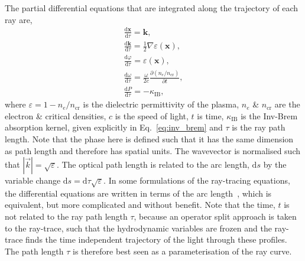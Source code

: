 The partial differential equations that are integrated along the trajectory of each ray are,
\begin{equation}
    \label{eq:SOLAS_rays}
    \begin{gathered}
        \frac{\text{d} \mathbf{x}}{\text{d} \tau}=\mathbf{k}, \\
        \frac{\text{d} \mathbf{k}}{\text{d} \tau}=\frac{1}{2} \nabla \varepsilon(\mathbf{x}), \\
        \frac{\text{d} \varphi}{\text{d} \tau}= \varepsilon(\mathbf{x}), \\
        \frac{\text{d} \omega}{\text{d} \tau}=\frac{\omega}{2 c} \frac{\partial\left(n_e / n_{\text{cr}}\right)}{\partial t}, \\
        \frac{\text{d} P}{\text{d} \tau}=-\kappa_{\text{IB}},
    \end{gathered}
\end{equation}
where $\varepsilon=1-n_e/n_{\text{cr}}$ is the dielectric permittivity of the plasma, $n_e$ \& $n_{\text{cr}}$ are the electron \& critical densities, $c$ is the speed of light, $t$ is time, $\kappa_{\text{IB}}$ is the \ac{Inv-Brem} absorption kernel, given explicitly in Eq.~\ref{eq:inv_brem} and $\tau$ is the ray path length.
Note that the phase here is defined such that it has the same dimension as path length and therefore has spatial units.
The wavevector is normalised such that $|\vec{k}|=\sqrt{\varepsilon}$.
The optical path length is related to the arc length, $\text{d}s$ by the variable change $\text{d}s=\text{d}\tau\sqrt{\varepsilon}$.
In some formulations of the ray-tracing equations, the differential equations are written in terms of the arc length~\cite{marozas_wavelength-detuning_2018,kaiser_laser_2000}, which is equivalent, but more complicated and without benefit.
Note that the time, $t$ is not related to the ray path length $\tau$, because an operator split approach is taken to the ray-trace, such that the hydrodynamic variables are frozen and the ray-trace finds the time independent trajectory of the light through these profiles.
The path length $\tau$ is therefore best seen as a parameterisation of the ray curve.

